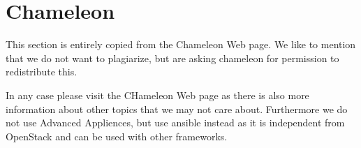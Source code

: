 
%


\part{Chameleon}

This section is entirely copied from the Chameleon Web page. We like
to mention that we do not want to plagiarize, but are asking chameleon
for permission to redistribute this. 

In any case please visit the CHameleon Web page as there is also more
information about other topics that we may not care about. Furthermore
we do not use Advanced Appliences, but use ansible instead as it is
independent from OpenStack and can be used with other frameworks.










%